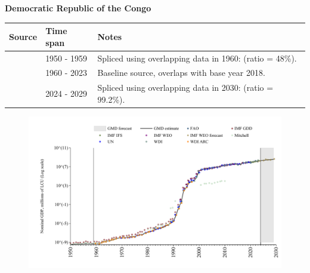 \documentclass[12pt,a4paper,landscape]{article}
\begin{document}
\begin{adjustbox}{max totalsize={\paperwidth}{\paperheight},center}
\begin{minipage}[t][\textheight][t]{\textwidth}
\vspace*{0.5cm}
{}
\begin{center}
{\Large\bfseries Democratic Republic of the Congo}
\end{center}
\vspace{0.5cm}
\begin{table}[H]
\centering
\small
\begin{tabular}{|l|l|l|}
\hline
\textbf{Source} & \textbf{Time span} & \textbf{Notes} \\
\hline
\rowcolor{white}\cite{IMF_GDD}& 1950 - 1959 &Spliced using overlapping data in 1960: (ratio = 48\%).\\
\rowcolor{lightgray}\cite{WDI}& 1960 - 2023 &Baseline source, overlaps with base year 2018.\\
\rowcolor{white}\cite{IMF_WEO_forecast}& 2024 - 2029 &Spliced using overlapping data in 2030: (ratio = 99.2\%).\\
\hline
\end{tabular}
\end{table}
\begin{figure}[H]
\centering
\includegraphics[width=\textwidth,height=0.6\textheight,keepaspectratio]{graphs/COD_nGDP.pdf}
\end{figure}
\end{minipage}
\end{adjustbox}
\end{document}
